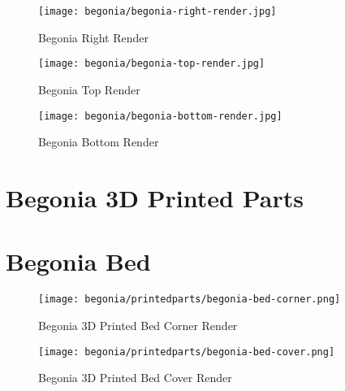 \begin{figure}[H]
\centering
\texttt{[image: begonia/begonia-right-render.jpg]}
\caption{Begonia Right Render}
\label{fig:begrightrender}
\end{figure}

\begin{figure}[H]
\centering
\texttt{[image: begonia/begonia-top-render.jpg]}
\caption{Begonia Top Render}
\label{fig:begtoprender}
\end{figure}

\begin{figure}[H]
\centering
\texttt{[image: begonia/begonia-bottom-render.jpg]}
\caption{Begonia Bottom Render}
\label{fig:begbottomrender}
\end{figure}


\section{Begonia 3D Printed Parts}

% 

\section{Begonia Bed}

\begin{figure}[H]
\centering
\texttt{[image: begonia/printedparts/begonia-bed-corner.png]}
\caption{Begonia 3D Printed Bed Corner Render}
\label{fig:begbedcornerrender}
\end{figure}

\begin{figure}[H]
\centering
\texttt{[image: begonia/printedparts/begonia-bed-cover.png]}
\caption{Begonia 3D Printed Bed Cover Render}
\label{fig:begbedcoverrender}
\end{figure}

